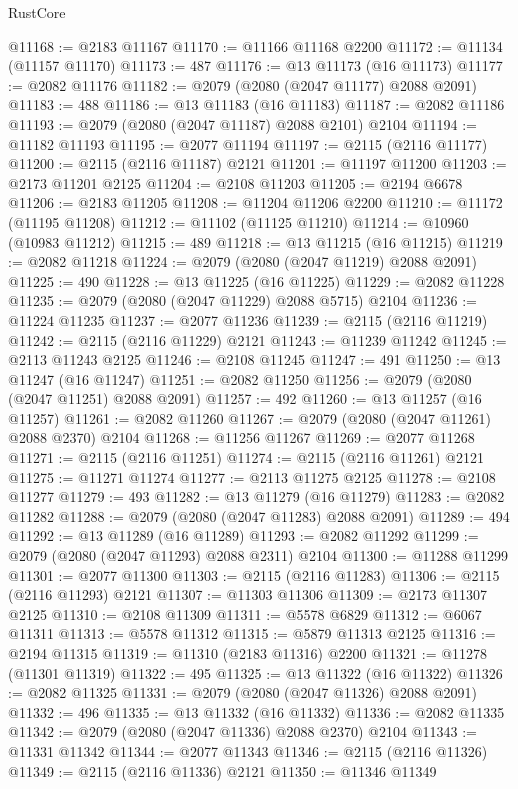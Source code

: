 \begin{lexlean}{RustCore}
\begin{coremodule}
@11168 := @2183 @11167
@11170 := @11166 @11168 @2200
@11172 := @11134 (@11157 @11170)
@11173 := 487
@11176 := @13 @11173 (@16 @11173)
@11177 := @2082 @11176
@11182 := @2079 (@2080 (@2047 @11177) @2088 @2091)
@11183 := 488
@11186 := @13 @11183 (@16 @11183)
@11187 := @2082 @11186
@11193 := @2079 (@2080 (@2047 @11187) @2088 @2101) @2104
@11194 := @11182 @11193
@11195 := @2077 @11194
@11197 := @2115 (@2116 @11177)
@11200 := @2115 (@2116 @11187) @2121
@11201 := @11197 @11200
@11203 := @2173 @11201 @2125
@11204 := @2108 @11203
@11205 := @2194 @6678
@11206 := @2183 @11205
@11208 := @11204 @11206 @2200
@11210 := @11172 (@11195 @11208)
@11212 := @11102 (@11125 @11210)
@11214 := @10960 (@10983 @11212)
@11215 := 489
@11218 := @13 @11215 (@16 @11215)
@11219 := @2082 @11218
@11224 := @2079 (@2080 (@2047 @11219) @2088 @2091)
@11225 := 490
@11228 := @13 @11225 (@16 @11225)
@11229 := @2082 @11228
@11235 := @2079 (@2080 (@2047 @11229) @2088 @5715) @2104
@11236 := @11224 @11235
@11237 := @2077 @11236
@11239 := @2115 (@2116 @11219)
@11242 := @2115 (@2116 @11229) @2121
@11243 := @11239 @11242
@11245 := @2113 @11243 @2125
@11246 := @2108 @11245
@11247 := 491
@11250 := @13 @11247 (@16 @11247)
@11251 := @2082 @11250
@11256 := @2079 (@2080 (@2047 @11251) @2088 @2091)
@11257 := 492
@11260 := @13 @11257 (@16 @11257)
@11261 := @2082 @11260
@11267 := @2079 (@2080 (@2047 @11261) @2088 @2370) @2104
@11268 := @11256 @11267
@11269 := @2077 @11268
@11271 := @2115 (@2116 @11251)
@11274 := @2115 (@2116 @11261) @2121
@11275 := @11271 @11274
@11277 := @2113 @11275 @2125
@11278 := @2108 @11277
@11279 := 493
@11282 := @13 @11279 (@16 @11279)
@11283 := @2082 @11282
@11288 := @2079 (@2080 (@2047 @11283) @2088 @2091)
@11289 := 494
@11292 := @13 @11289 (@16 @11289)
@11293 := @2082 @11292
@11299 := @2079 (@2080 (@2047 @11293) @2088 @2311) @2104
@11300 := @11288 @11299
@11301 := @2077 @11300
@11303 := @2115 (@2116 @11283)
@11306 := @2115 (@2116 @11293) @2121
@11307 := @11303 @11306
@11309 := @2173 @11307 @2125
@11310 := @2108 @11309
@11311 := @5578 @6829
@11312 := @6067 @11311
@11313 := @5578 @11312
@11315 := @5879 @11313 @2125
@11316 := @2194 @11315
@11319 := @11310 (@2183 @11316) @2200
@11321 := @11278 (@11301 @11319)
@11322 := 495
@11325 := @13 @11322 (@16 @11322)
@11326 := @2082 @11325
@11331 := @2079 (@2080 (@2047 @11326) @2088 @2091)
@11332 := 496
@11335 := @13 @11332 (@16 @11332)
@11336 := @2082 @11335
@11342 := @2079 (@2080 (@2047 @11336) @2088 @2370) @2104
@11343 := @11331 @11342
@11344 := @2077 @11343
@11346 := @2115 (@2116 @11326)
@11349 := @2115 (@2116 @11336) @2121
@11350 := @11346 @11349

\end{coremodule}
\end{lexlean}
